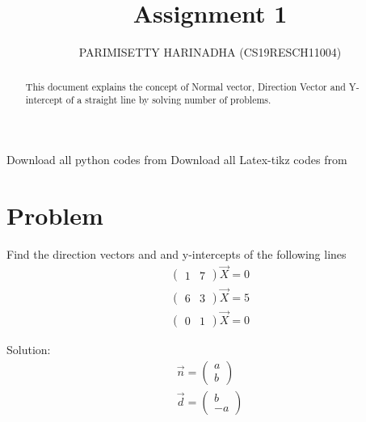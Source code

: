 \documentclass[journal,12pt,twocolumn]{IEEEtran}
\title{Assignment 1}
\author{PARIMISETTY HARINADHA (CS19RESCH11004)}
\newcommand{\myvec}[1]{\ensuremath{\begin{pmatrix}#1\end{pmatrix}}}
\begin{document}
\maketitle
\newpage
\begin{abstract}
This document explains the concept of Normal vector, Direction Vector and Y-intercept of a straight line by solving number of problems.
\end{abstract}
Download all python codes from 
\newline
\newline
Download all Latex-tikz codes from 

\section{Problem}
Find the direction vectors and and y-intercepts of the following lines
\begin{align} 
    		\myvec{ 1 & 7 } \vec{X}	= 0\\
    		\myvec{ 6 & 3 }	\vec{X}	= 5\\
		\myvec{ 0 & 1 }	\vec{X}	= 0
\end{align}

Solution:
\begin{align}
	\vec{n} = \myvec{ a \\ b }\\
	\vec{d} = \myvec{ b \\ -a }
\end{align}
\end{document}
